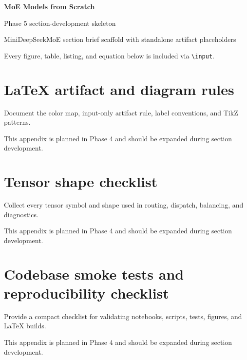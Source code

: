\documentclass[10pt]{book}
\begin{document}
\frontmatter
\begin{titlepage}
\centering
{\Huge\bfseries\color{BookNavy} MoE Models from Scratch\par}
\vspace{1em}
{\Large Phase 5 section-development skeleton\par}
\vspace{2em}
{\large MiniDeepSeekMoE section brief scaffold with standalone artifact placeholders\par}
\vfill
{\large Every figure, table, listing, and equation below is included via \texttt{\textbackslash input}.\par}
\end{titlepage}
\tableofcontents
\mainmatter












\appendix
\chapter{LaTeX artifact and diagram rules}
Document the color map, input-only artifact rule, label conventions, and TikZ patterns.
\begin{notebox}
This appendix is planned in Phase 4 and should be expanded during section development.
\end{notebox}
\chapter{Tensor shape checklist}
Collect every tensor symbol and shape used in routing, dispatch, balancing, and diagnostics.
\begin{notebox}
This appendix is planned in Phase 4 and should be expanded during section development.
\end{notebox}
\chapter{Codebase smoke tests and reproducibility checklist}
Provide a compact checklist for validating notebooks, scripts, tests, figures, and LaTeX builds.
\begin{notebox}
This appendix is planned in Phase 4 and should be expanded during section development.
\end{notebox}
\end{document}
